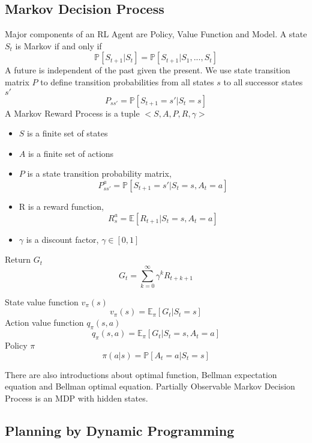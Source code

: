 \documentclass[10pt,twocolumn,letterpaper]{article}
\begin{document}
	\subsection{Markov Decision Process}
	
	Major components of an RL Agent are Policy, Value Function and Model. A state $S_t$ is Markov if and only if
	\begin{equation}
		\mathbb{P}[S_{t+1}|S_t] = \mathbb{P}[S_{t+1}|S_1, ... , S_t]
	\end{equation}
	A future is independent of the past given the present. We use state transition matrix $P$ to define transition probabilities from all states $s$ to all successor states $s'$
	\begin{equation}
		P_{ss'}=\mathbb{P}[S_{t+1}=s'|S_t=s]
	\end{equation}
	A Markov Reward Process is a tuple $<S, A, P, R, \gamma>$
	\begin{itemize}
		\item $S$ is a finite set of states
		\item $A$ is a finite set of actions
		\item $P$ is a state transition probability matrix,
		$$P_{ss'}^{a} = \mathbb{P}[S_{t+1} = s'| S_t = s, A_t = a]$$
		\item R is a reward function, $$R_s^a = \mathbb{E}[R_{t+1}|S_t=s, A_t = a]$$
		\item $\gamma$ is a discount factor, $\gamma \in  [0, 1]$
	\end{itemize}
	
	Return $G_t$ $$G_t=\sum_{k=0}^{\infty} \gamma^k R_{t+k+1}$$
	
	State value function $v_\pi (s)$
	$$v_\pi (s) = \mathbb{E}_\pi [G_t|S_t = s]$$
	Action value function $q_\pi (s, a)$
	$$q_\pi (s, a) = \mathbb{E}_\pi [G_t|S_t = s, A_t = a]$$
	Policy $\pi$ $$\pi (a|s) = \mathbb{P}[A_t = a|S_t=s]$$
	
	There are also introductions about optimal function, Bellman expectation equation and Bellman optimal equation. Partially Observable Markov Decision Process is an MDP with hidden states.
	\subsection{Planning by Dynamic Programming}
	
\end{document}
